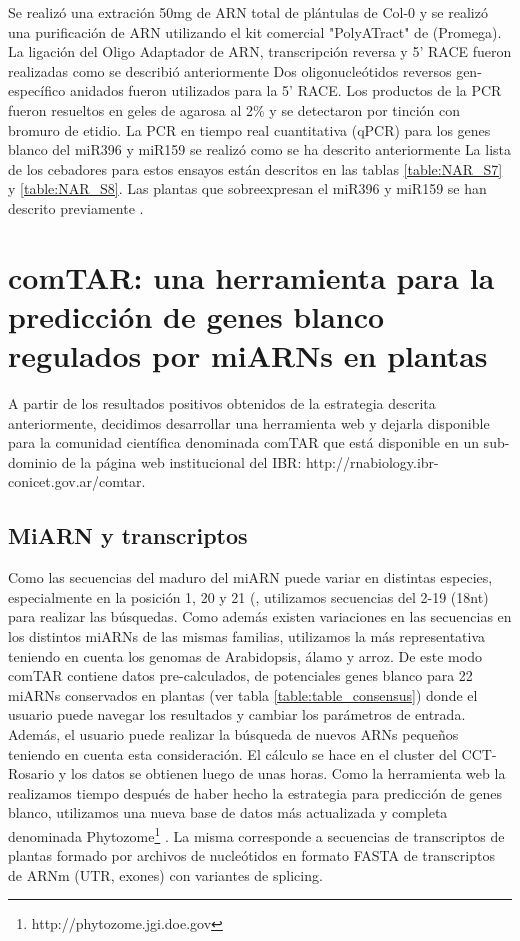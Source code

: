 Se realizó una extración 50mg de ARN total de plántulas de Col-0 y se realizó una purificación de ARN utilizando el kit comercial "PolyATract\textregistered" de (Promega).
La ligación del Oligo Adaptador de ARN, transcripción reversa y 5' RACE fueron realizadas como se describió anteriormente \citep{Palatnik2007}
Dos oligonucleótidos reversos gen-específico anidados fueron utilizados para la 5' RACE.
Los productos de la PCR fueron resueltos en geles de agarosa al 2\% y se detectaron por tinción con bromuro de etidio.
La PCR en tiempo real cuantitativa (qPCR) para los genes blanco del miR396 y miR159 se realizó como se ha descrito anteriormente \citep{Palatnik2007,Rodriguez2010}
La lista de los cebadores para estos ensayos están descritos en las tablas \ref{table:NAR_S7} y \ref{table:NAR_S8}.
Las plantas que sobreexpresan el miR396 y miR159 se han descrito previamente \citep{Palatnik2007,Rodriguez2010}.


\section{comTAR: una herramienta para la predicción de genes blanco regulados por miARNs en plantas}

A partir de los resultados positivos obtenidos de la estrategia descrita anteriormente, decidimos desarrollar una herramienta web y dejarla disponible para la comunidad científica denominada comTAR que está disponible en un sub-dominio de la página web institucional del IBR: http://rnabiology.ibr-conicet.gov.ar/comtar.

\subsection{MiARN y transcriptos}
Como las secuencias del maduro del miARN puede variar en distintas especies, especialmente en la posición 1, 20 y 21 (\citep{Chorostecki05072012}, utilizamos secuencias del 2-19 (18nt) para realizar las búsquedas.
Como además existen variaciones en las secuencias en los distintos miARNs de las mismas familias, utilizamos la más representativa teniendo en cuenta los genomas de Arabidopsis, álamo y arroz. 
De este modo comTAR contiene datos pre-calculados, de potenciales genes blanco para 22 miARNs conservados en plantas (ver tabla \ref{table:table_consensus}) donde el usuario puede navegar los resultados y cambiar los parámetros de entrada.
Además, el usuario puede realizar la búsqueda de nuevos ARNs pequeños teniendo en cuenta esta consideración. El cálculo se hace en el cluster del CCT-Rosario y los datos se obtienen luego de unas horas.
Como la herramienta web la realizamos tiempo después de haber hecho la estrategia para predicción de genes blanco, utilizamos una nueva base de datos más actualizada y completa denominada Phytozome\footnote{http://phytozome.jgi.doe.gov} \citep{Goodstein2012}. 
La misma corresponde a secuencias de transcriptos de plantas formado por archivos de nucleótidos en formato FASTA de transcriptos de ARNm (UTR, exones) con variantes de splicing.

